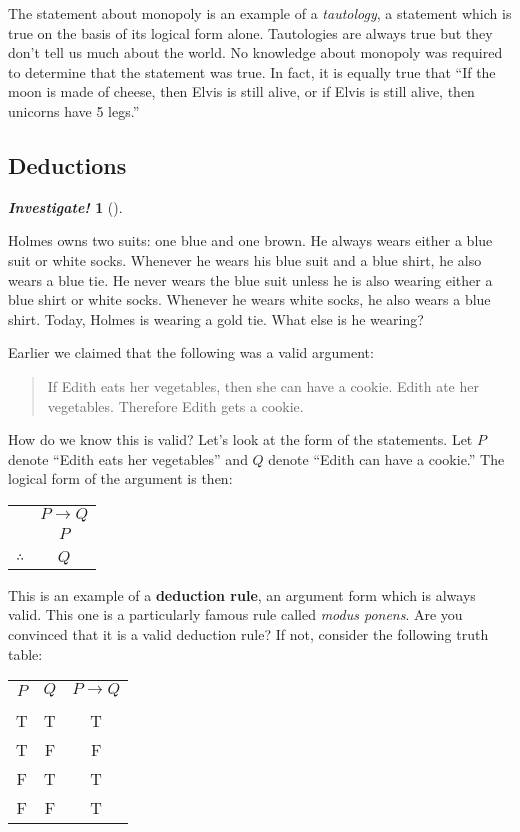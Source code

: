 \documentclass[10pt,]{book}
\newcommand{\terminology}[1]{\textbf{#1}}
\theoremstyle{plain}
\theoremstyle{definition}
\theoremstyle{definition}
\newtheorem{investigation}[project]{\emph{Investigate!}}
\theoremstyle{definition}
\numberwithin{equation}{chapter}
\newcommand{\hrulethin}  {\noalign{\hrule height 0.04em}}
\def\imp{\rightarrow}
\begin{document}
          The statement about monopoly is an example of a \emph{tautology}, a statement which is true on the basis of its logical form alone. Tautologies are always true but they don't tell us much about the world. No knowledge about monopoly was required to determine that the statement was true. In fact, it is equally true that ``If the moon is made of cheese, then Elvis is still alive, or if Elvis is still alive, then unicorns have 5 legs.''
\typeout{************************************************}
\typeout{************************************************}
\subsection[Deductions]{Deductions}\label{subsection-28}
\begin{investigation}[]\label{investigation-25}

            Holmes owns two suits: one blue and one brown. He always wears either a blue suit or white socks. Whenever he wears his blue suit and a blue shirt, he also wears a blue tie. He never wears the blue suit unless he is also wearing either a blue shirt or white socks. Whenever he wears white socks, he also wears a blue shirt. Today, Holmes is wearing a gold tie. What else is he wearing?
\end{investigation}

          Earlier we claimed that the following was a valid argument:
\begin{quote}
          If Edith eats her vegetables, then she can have a cookie. Edith ate her vegetables. Therefore Edith gets a cookie.
        \end{quote}
\par

          How do we know this is valid? Let's look at the form of the statements. Let \(P\) denote ``Edith eats her vegetables'' and \(Q\) denote ``Edith can have a cookie.'' The logical form of the argument is then:
\leavevmode%
\begin{table}
\centering
\begin{tabular}{cc}
&\(P \imp Q\)\tabularnewline[0pt]
&\(P\)\tabularnewline[0pt]
&\tabularnewline\hrulethin
\(\therefore\)&\(Q\)
\end{tabular}
\end{table}
\par

          This is an example of a \terminology{deduction rule}, an argument form which is always valid. This one is a particularly famous rule called \emph{modus ponens}\index{}. Are you convinced that it is a valid deduction rule? If not, consider the following truth table:
\leavevmode%
\begin{table}
\centering
\begin{tabular}{ccc}
\(P\)&\(Q\)&\(P\imp Q\)\tabularnewline[0pt]
&&\tabularnewline\hrulethin
T&T&T\tabularnewline[0pt]
T&F&F\tabularnewline[0pt]
F&T&T\tabularnewline[0pt]
F&F&T
\end{tabular}
\end{table}
\par
\end{document}
